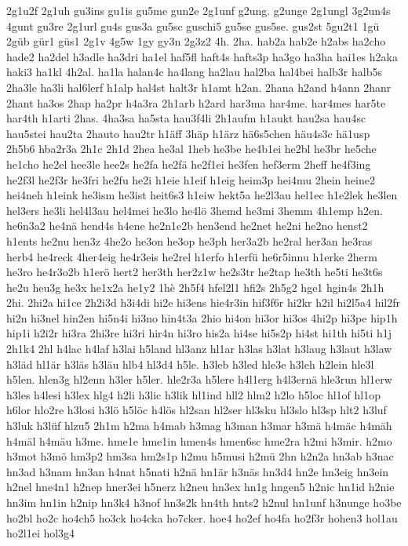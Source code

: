 {2g1u2f
2g1uh
gu3ins
gu1is
gu5me
gun2e
2g1unf
g2ung.
g2unge
2g1ungl
3g2un4s
4gunt
gu3re
2g1url
gu4s
gus3a
gu5sc
guschi5
gu5se
gus5se.
gus2st
5gu2t1
1gü
2güb
gür1
güs1
2g1v
4g5w
1gy
gy3n
2g3z2
4h.
2ha.
hab2a
hab2e
h2abs
ha2cho
hade2
ha2del
h3adle
ha3dri
ha1el
haf5fl
haft4s
hafts3p
ha3go
ha3ha
hai1es
h2aka
haki3
ha1kl
4h2al.
ha1la
halan4c
ha4lang
ha2lau
hal2ba
hal4bei
halb3r
halb5s
2ha3le
ha3li
hal6lerf
h1alp
hal4st
halt3r
h1amt
h2an.
2hana
h2and
h4ann
2hanr
2hant
ha3os
2hap
ha2pr
h4a3ra
2h1arb
h2ard
har3ma
har4me.
har4mes
har5te
har4th
h1arti
2has.
4ha3sa
ha5sta
hau3f4li
2h1aufm
h1aukt
hau2sa
hau4sc
hau5stei
hau2ta
2hauto
hau2tr
h1äff
3häp
h1ärz
hä6s5chen
häu4s3c
hä1usp
2h5b6
hba2r3a
2h1c
2h1d
2hea
he3al
1heb
he3be
he4b1ei
he2bl
he3br
he5che
he1cho
he2el
hee3le
hee2s
he2fa
he2fä
he2f1ei
he3fen
hef3erm
2heff
he4f3ing
he2f3l
he2f3r
he3fri
he2fu
he2i
h1eie
h1eif
h1eig
heim3p
hei4mu
2hein
heine2
hei4neh
h1eink
he3ism
he3ist
heit6s3
h1eiw
hekt5a
he2l3au
hel1ec
h1e2lek
he3len
hel3ers
he3li
hel4l3au
hel4mei
he3lo
he4lö
3hemd
he3mi
3hemm
4h1emp
h2en.
he6n3a2
he4nä
hend4s
h4ene
he2n1e2b
hen3end
he2net
he2ni
he2no
henst2
h1ents
he2nu
hen3z
4he2o
he3on
he3op
he3ph
her3a2b
he2ral
her3an
he3ras
herb4
he4reck
4her4eig
he4r3eis
he2rel
h1erfo
h1erfü
he6r5innu
h1erke
2herm
he3ro
he4r3o2b
h1erö
hert2
her3th
her2z1w
he2s3tr
he2tap
he3th
he5ti
he3t6s
he2u
heu3g
he3x
he1x2a
he1y2
1hè
2h5f4
hfel2l1
hfi2s
2h5g2
hge1
hgin4s
2h1h
2hi.
2hi2a
hi1ce
2h2i3d
h3i4di
hi2e
hi3ens
hie4r3in
hif3f6r
hi2kr
h2il
hi2l5a4
hil2fr
hi2n
hi3nel
hin2en
hi5n4i
hi3no
hin4t3a
2hio
hi4on
hi3or
hi3os
4hi2p
hi3pe
hip1h
hip1i
h2i2r
hi3ra
2hi3re
hi3ri
hir4n
hi3ro
his2a
hi4se
hi5s2p
hi4st
hi1th
hi5ti
h1j
2h1k4
2hl
h4lac
h4laf
h3lai
h5land
hl3anz
hl1ar
h3las
h3lat
h3laug
h3laut
h3law
h3läd
hl1är
h3läs
h3läu
hlb4
hl3d4
h5le.
h3leb
h3led
hle3e
h3leh
h2lein
hle3l
h5len.
hlen3g
hl2enn
h3ler
h5ler.
hle2r3a
h5lere
h4l1erg
h4l3ernä
hle3run
hl1erw
h3les
h4lesi
h3lex
hlg4
h2li
h3lic
h3lik
hl1ind
hll2
hlm2
h2lo
h5loc
hl1of
hl1op
h6lor
hlo2re
h3losi
h3lö
h5löc
h4lös
hl2san
hl2ser
hl3sku
hl3slo
hl3sp
hlt2
h3luf
h3luk
h3lüf
hlzu5
2h1m
h2ma
h4mab
h3mag
h3man
h3mar
h3mä
h4mäc
h4mäh
h4mäl
h4mäu
h3me.
hme1e
hme1in
hmen4s
hmen6sc
hme2ra
h2mi
h3mir.
h2mo
h3mot
h3mö
hm3p2
hm3sa
hm2s1p
h2mu
h5musi
h2mü
2hn
h2n2a
hn3ab
h3nac
hn3ad
h3nam
hn3an
h4nat
h5nati
h2nä
hn1är
h3näs
hn3d4
hn2e
hn3eig
hn3ein
h2nel
hne4n1
h2nep
hner3ei
h5nerz
h2neu
hn3ex
hn1g
hngen5
h2nic
hn1id
h2nie
hn3im
hn1in
h2nip
hn3k4
h3nof
hn3s2k
hn4th
hnts2
h2nul
hn1unf
h3nunge
ho3be
ho2bl
ho2c
ho4ch5
ho3ck
ho4cka
ho7cker.
hoe4
ho2ef
ho4fa
ho2f3r
hohen3
hol1au
ho2l1ei
hol3g4
}
